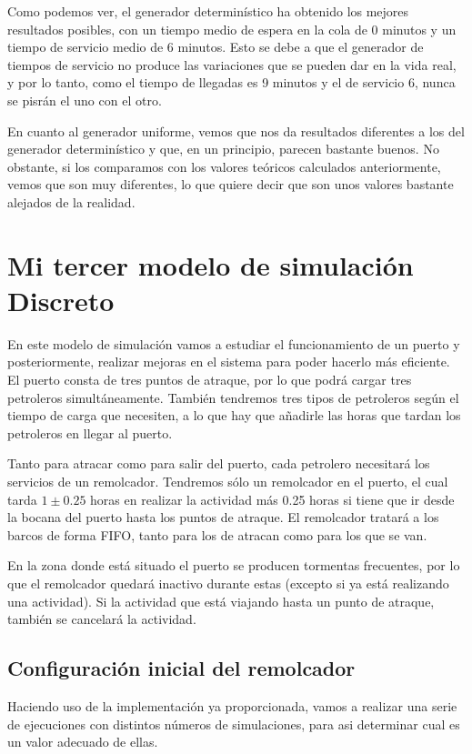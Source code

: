 \documentclass[11pt,a4paper]{report}
\begin{document}
Como podemos ver, el generador determinístico ha obtenido los mejores resultados posibles, con un tiempo medio de espera en la cola de 0 minutos y un tiempo
de servicio medio de 6 minutos. Esto se debe a que el generador de tiempos de servicio no produce las variaciones que se pueden dar en la vida real, y por lo
tanto, como el tiempo de llegadas es 9 minutos y el de servicio 6, nunca se pisrán el uno con el otro.

En cuanto al generador uniforme, vemos que nos da resultados diferentes a los del generador determinístico y que, en un principio, parecen bastante buenos. No
obstante, si los comparamos con los valores teóricos calculados anteriormente, vemos que son muy diferentes, lo que quiere decir que son unos valores bastante
alejados de la realidad.




\chapter{Mi tercer modelo de simulación Discreto}

En este modelo de simulación vamos a estudiar el funcionamiento de un puerto y posteriormente, realizar mejoras en el sistema para poder hacerlo más eficiente.
El puerto consta de tres puntos de atraque, por lo que podrá cargar tres petroleros simultáneamente. También tendremos tres tipos de petroleros según el tiempo
de carga que necesiten, a lo que hay que añadirle las horas que tardan los petroleros en llegar al puerto.

Tanto para atracar como para salir del puerto, cada petrolero necesitará los servicios de un remolcador. Tendremos sólo un remolcador en el puerto, el cual tarda
$1 \pm 0.25$ horas en realizar la actividad más 0.25 horas si tiene que ir desde la bocana del puerto hasta los puntos de atraque. El remolcador tratará a los
barcos de forma FIFO, tanto para los de atracan como para los que se van.

En la zona donde está situado el puerto se producen tormentas frecuentes, por lo que el remolcador quedará inactivo durante estas (excepto si ya está realizando
una actividad). Si la actividad que está viajando hasta un punto de atraque, también se cancelará la actividad.


\section{Configuración inicial del remolcador}
Haciendo uso de la implementación ya proporcionada, vamos a realizar una serie de ejecuciones con distintos números de simulaciones, para asi determinar cual
es un valor adecuado de ellas.
\end{document}
